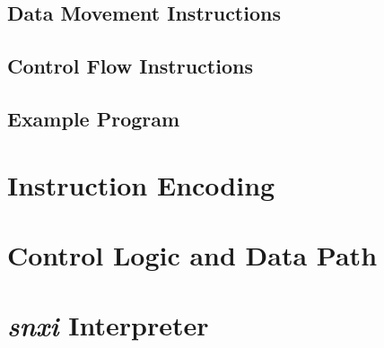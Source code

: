 \documentclass{article}
\begin{document}
\subsection{Data Movement Instructions}
\subsection{Control Flow Instructions}
\subsection{Example Program}

\section{Instruction Encoding}

\section{Control Logic and Data Path}

\section{\emph{snxi} Interpreter}
\end{document}

